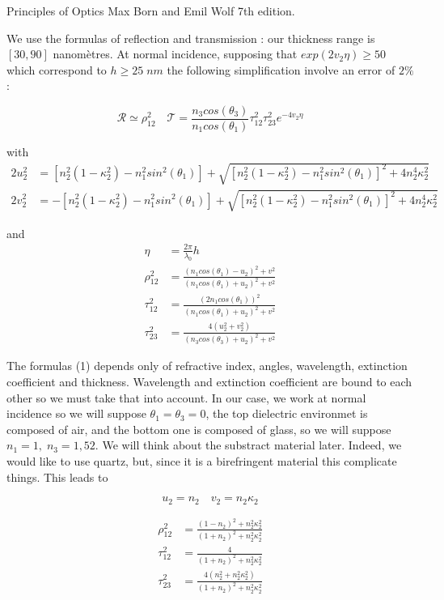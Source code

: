 Principles of Optics Max Born and Emil Wolf 7th edition.

We use the formulas of reflection and transmission : our thickness range is $[30, 90]$ nanomètres. At normal incidence, supposing that $exp(2v_2\eta)\geq 50$ which correspond to $h\geq 25 \; nm$ the following simplification involve an error of $2\%$ :

\begin{equation}
  \mathcal{R} \simeq \rho_{12}^2 \quad \mathcal{T} = \frac{n_3cos(\theta_3)}{n_1cos(\theta_1)}\tau_{12}^2\tau_{23}^2e^{-4v_2\eta}
\end{equation}

with 
\begin{align*}
  2u_2^2 &= \left[n_2^2(1-\kappa_2^2)-n_1^2sin^2(\theta_1)\right] + \sqrt{\left[n_2^2(1-\kappa_2^2)-n_1^2sin^2(\theta_1)\right]^2 + 4n_2^4\kappa_2^2}\\
  2v_2^2 &= -\left[n_2^2(1-\kappa_2^2)-n_1^2sin^2(\theta_1)\right] + \sqrt{\left[n_2^2(1-\kappa_2^2)-n_1^2sin^2(\theta_1)\right]^2 + 4n_2^4\kappa_2^2}
\end{align*}

and 
\begin{align*}
  \eta &= \frac{2\pi}{\lambda_0}h\\
  \rho_{12}^2 &= \frac{(n_1cos(\theta_1) - u_2)^2+v^2}{(n_1cos(\theta_1) + u_2)^2+v^2}\\
  \tau_{12}^2 &= \frac{(2n_1cos(\theta_1))^2}{(n_1cos(\theta_1) + u_2)^2+v^2}\\
  \tau_{23}^2 &= \frac{4(u_2^2+v_2^2)}{(n_3cos(\theta_3) + u_2)^2+v^2}
\end{align*}

The formulas (1) depends only of refractive index, angles, wavelength, extinction coefficient and thickness. Wavelength and extinction coefficient are bound to each other so we must take that into account. In our case, we work at normal incidence so we will suppose $\theta_1=\theta_3=0$, the top dielectric environmet is composed of air, and the bottom one is composed of glass, so we will suppose $n_1=1, \; n_3=1,52$. We will think about the substract material later. Indeed, we would like to use quartz, but, since it is a birefringent material this complicate things. This leads to

\begin{equation*}
  u_2 = n_2 \quad v_2 = n_2 \kappa_2
\end{equation*}

\begin{align*}
  \rho_{12}^2 &= \frac{(1-n_2)^2 + n_2^2\kappa_2^2}{(1+n_2)^2 + n_2^2\kappa_2^2}\\
  \tau_{12}^2 &= \frac{4}{(1+n_2)^2 + n_2^2\kappa_2^2}\\
  \tau_{23}^2 &= \frac{4(n_2^2+n_2^2\kappa_2^2)}{(1+n_2)^2 + n_2^2\kappa_2^2}
\end{align*}

